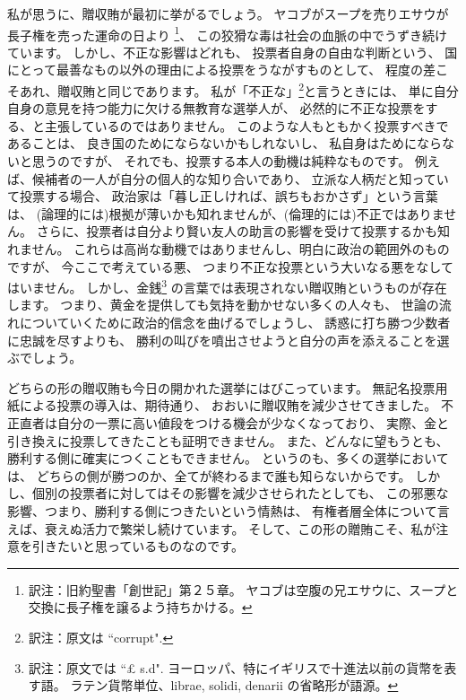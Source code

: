\documentclass{article}
\begin{document}
私が思うに、贈収賄が最初に挙がるでしょう。
ヤコブがスープを売りエサウが長子権を売った運命の日より
\footnote{訳注：旧約聖書「創世記」第２５章。
ヤコブは空腹の兄エサウに、スープと交換に長子権を譲るよう持ちかける。}、
この狡猾な毒は社会の血脈の中でうずき続けています。
しかし、不正な影響はどれも、
投票者自身の自由な判断という、
国にとって最善なもの以外の理由による投票をうながすものとして、
程度の差こそあれ、贈収賄と同じであります。
私が「不正な」\footnote{訳注：原文は ``corrupt".}と言うときには、
単に自分自身の意見を持つ能力に欠ける無教育な選挙人が、
必然的に不正な投票をする、と主張しているのではありません。
このような人もともかく投票すべきであることは、
良き国のためにならないかもしれないし、
私自身はためにならないと思うのですが、
それでも、投票する本人の動機は純粋なものです。
例えば、候補者の一人が自分の個人的な知り合いであり、
立派な人柄だと知っていて投票する場合、
政治家は「暮し正しければ、誤ちもおかさず」という言葉は、
(論理的には)根拠が薄いかも知れませんが、(倫理的には)不正ではありません。
さらに、投票者は自分より賢い友人の助言の影響を受けて投票するかも知れません。
これらは高尚な動機ではありませんし、明白に政治の範囲外のものですが、
今ここで考えている悪、
つまり不正な投票という大いなる悪をなしてはいません。
しかし、金銭\footnote{訳注：原文では ``£ s.d".
ヨーロッパ、特にイギリスで十進法以前の貨幣を表す語。
ラテン貨幣単位、librae, solidi, denarii の省略形が語源。}
の言葉では表現されない贈収賄というものが存在します。
つまり、黄金を提供しても気持を動かせない多くの人々も、
世論の流れについていくために政治的信念を曲げるでしょうし、
誘惑に打ち勝つ少数者に忠誠を尽すよりも、
勝利の叫びを噴出させようと自分の声を添えることを選ぶでしょう。

\medskip

どちらの形の贈収賄も今日の開かれた選挙にはびこっています。
無記名投票用紙による投票の導入は、期待通り、
おおいに贈収賄を減少させてきました。
不正直者は自分の一票に高い値段をつける機会が少なくなっており、
実際、金と引き換えに投票してきたことも証明できません。
また、どんなに望もうとも、勝利する側に確実につくこともできません。
というのも、多くの選挙においては、
どちらの側が勝つのか、全てが終わるまで誰も知らないからです。
しかし、個別の投票者に対してはその影響を減少させられたとしても、
この邪悪な影響、つまり、勝利する側につきたいという情熱は、
有権者層全体について言えば、衰えぬ活力で繁栄し続けています。
そして、この形の贈賄こそ、私が注意を引きたいと思っているものなのです。

\medskip
\end{document}
